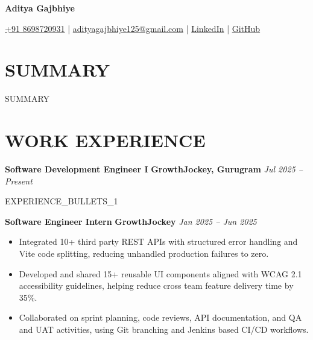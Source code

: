 \documentclass[a4paper,10pt]{article}
\newcommand{\rolerow}[3]{%
    \noindent
    {\bfseries\color{dark}#1}\enspace
    {\bfseries\color{accent}#2}%
    \hfill{\small\color{light}\itshape #3}%
}
\begin{document}
\pagestyle{empty}


\begin{center}
    {\LARGE\bfseries\color{dark} Aditya Gajbhiye}

    \smallskip

    \small
    \href{tel:+918698720931}{+91 8698720931}
    \enspace|\enspace
    \href{mailto:adityagajbhiye125@gmail.com}
    {adityagajbhiye125@gmail.com}
    \enspace|\enspace
    \href{https://linkedin.com/in/aditya-gajbhiye-9b6048230}
    {LinkedIn}
    \enspace|\enspace
    \href{https://github.com/OneCODE2}
    {GitHub}
\end{center}

\vspace{2pt}


\section{SUMMARY}

{{SUMMARY}}


\section{WORK EXPERIENCE}

\rolerow{Software Development Engineer I}
{GrowthJockey, Gurugram}{Jul 2025 -- Present}

\vspace{2pt}

\begin{itemize}

{{EXPERIENCE_BULLETS_1}}

\end{itemize}

\vspace{3pt}

\rolerow{Software Engineer Intern}{GrowthJockey}{Jan 2025 -- Jun 2025}

\vspace{2pt}

\begin{itemize}

\item Integrated 10+ third party REST APIs with structured error handling
and Vite code splitting, reducing unhandled production failures to zero.

\item Developed and shared 15+ reusable UI components aligned with
WCAG 2.1 accessibility guidelines, helping reduce cross team feature
delivery time by 35\%.

\item Collaborated on sprint planning, code reviews, API documentation,
and QA and UAT activities, using Git branching and Jenkins based
CI/CD workflows.

\end{itemize}
\end{document}
